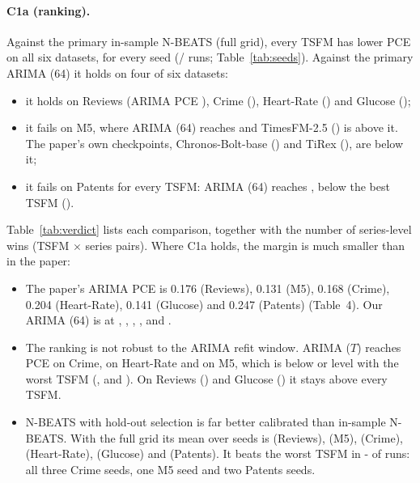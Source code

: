 \paragraph{C1a (ranking).} Against the primary in-sample N-BEATS (full grid), every TSFM has lower PCE on all
six datasets, for every seed (\cOneAholdsFull/\cOneArunsFull{} runs; Table~\ref{tab:seeds}). Against the primary
ARIMA (64) it holds on four of six datasets:
\begin{itemize}
\item it holds on Reviews (ARIMA PCE \pceArimaRev), Crime (\pceArimaCrime), Heart-Rate (\pceArimaHR) and Glucose
(\pceArimaGlucose);
\item it fails on M5, where ARIMA (64) reaches \pceArimaMfive{} and TimesFM-2.5 (\pceTfmMfive) is above it. The
paper's own checkpoints, Chronos-Bolt-base (\pceCbMfive) and TiRex (\pceTrxMfive), are below it;
\item it fails on Patents for every TSFM: ARIMA (64) reaches \pceArimaPat, below the best TSFM
(\minTSFMpcePat).
\end{itemize}
Table~\ref{tab:verdict} lists each comparison, together with the number of series-level wins (TSFM $\times$
series pairs). Where C1a holds, the margin is much smaller than in the paper:
\begin{itemize}
\item The paper's ARIMA PCE is 0.176 (Reviews), 0.131 (M5), 0.168 (Crime), 0.204 (Heart-Rate), 0.141 (Glucose)
and 0.247 (Patents) (Table~4). Our ARIMA (64) is at \pceArimaRev, \pceArimaMfive, \pceArimaCrime,
\pceArimaHR, \pceArimaGlucose{} and \pceArimaPat.
\item The ranking is not robust to the ARIMA refit window. ARIMA ($T$) reaches PCE \pceArimaTCrime{} on Crime,
\pceArimaTHR{} on Heart-Rate and \pceArimaTMfive{} on M5, which is below or level with the worst TSFM
(\maxTSFMpceCrime, \maxTSFMpceHR{} and \maxTSFMpceMfive). On Reviews (\pceArimaTRev) and Glucose
(\pceArimaTGlucose) it stays above every TSFM.
\item N-BEATS with hold-out selection is far better calibrated than in-sample N-BEATS. With the full grid its
mean over seeds is \pceNbeatsFHRevMean{} (Reviews), \pceNbeatsFHMfiveMean{} (M5), \pceNbeatsFHCrimeMean{}
(Crime), \pceNbeatsFHHRMean{} (Heart-Rate), \pceNbeatsFHGlucoseMean{} (Glucose) and \pceNbeatsFHPatMean{}
(Patents). It beats the worst TSFM in \the\numexpr\cOneArunsFullH-\cOneAholdsFullH\relax{} of
\cOneArunsFullH{} runs: all three Crime seeds, one M5 seed and two Patents seeds.
\end{itemize}


